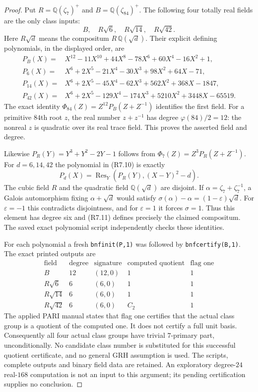 \begin{proof}
Put $R=\mathbb Q(\zeta_7)^+$ and $B=\mathbb Q(\zeta_{84})^+$.
The following four totally real fields are the only class inputs:
\[
                         B,\quad R\sqrt6,\quad R\sqrt{14},
                                      \quad R\sqrt{42}.
 \tag{R7.9}
\]
Here $R\sqrt d$ means the compositum $R\,\mathbb Q(\sqrt d)$.
Their explicit defining polynomials, in the displayed order, are
\[
 \begin{aligned}
 P_B(X)={}&X^{12}-11X^{10}+44X^8-78X^6+60X^4-16X^2+1,\\
 P_6(X)={}&X^6+2X^5-21X^4-30X^3+98X^2+64X-71,\\
 P_{14}(X)={}&X^6+2X^5-45X^4-62X^3+562X^2+368X-1847,\\
 P_{42}(X)={}&X^6+2X^5-129X^4-174X^3+5210X^2+3448X-65519.
 \end{aligned}\tag{R7.10}
\]
The exact identity
$\Phi_{84}(Z)=Z^{12}P_B(Z+Z^{-1})$ identifies the first field.
For a primitive $84$th root $z$, the real number $z+z^{-1}$
has degree $\varphi(84)/2=12$: the nonreal $z$ is quadratic
over its real trace field. This proves the asserted field and degree.

Likewise $P_R(Y)=Y^3+Y^2-2Y-1$ follows from
$\Phi_7(Z)=Z^3P_R(Z+Z^{-1})$.
For $d=6,14,42$ the polynomial in (R7.10) is exactly
\[
                P_d(X)=\operatorname{Res}_Y
                          (P_R(Y),(X-Y)^2-d).
 \tag{R7.11}
\]
The cubic field $R$ and the quadratic field $\mathbb Q(\sqrt d)$
are disjoint. If $\alpha=\zeta_7+\zeta_7^{-1}$, a Galois
automorphism fixing $\alpha+\sqrt d$ would satisfy
$\sigma(\alpha)-\alpha=(1-\varepsilon)\sqrt d$.
For $\varepsilon=-1$ this contradicts disjointness, and for
$\varepsilon=1$ it forces $\sigma=1$. Thus this element has
degree six and (R7.11) defines precisely the claimed compositum.
The saved exact polynomial script independently checks these identities.

For each polynomial a fresh \texttt{bnfinit(P,1)} was followed by
\texttt{bnfcertify(B,1)}. The exact printed outputs are
\[
 \begin{array}{c|c|c|c|c}
 \text{field}&\text{degree}&\text{signature}&\text{computed quotient}
                                      &\text{flag one}\\\hline
 B&12&(12,0)&1&1\\
 R\sqrt6&6&(6,0)&1&1\\
 R\sqrt{14}&6&(6,0)&1&1\\
 R\sqrt{42}&6&(6,0)&C_2&1
 \end{array}\tag{R7.12}
\]
The applied PARI manual states that flag one certifies that the
actual class group is a quotient of the computed one.
It does not certify a full unit basis. Consequently all four
actual class groups have trivial $7$-primary part, unconditionally.
No candidate class number is substituted for this successful
quotient certificate, and no general GRH assumption is used.
The scripts, complete outputs and binary field data are retained.
An exploratory degree-$24$ real-$168$ computation is not an input
to this argument; its pending certification supplies no conclusion.


\end{proof}
